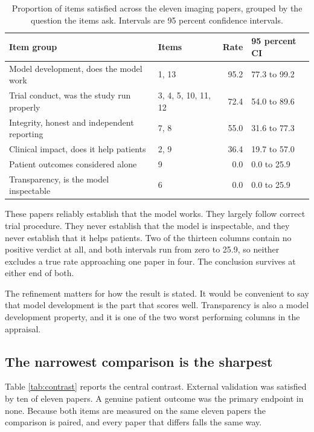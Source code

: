 \documentclass{article}
\begin{document}
\begin{table}[t]
  \caption{Proportion of items satisfied across the eleven imaging papers, grouped by the question
  the items ask. Intervals are 95 percent confidence intervals.}
  \label{tab:groups}
  \centering
  \begin{tabular}{llrl}
    \toprule
    Item group & Items & Rate & 95 percent CI \\
    \midrule
    Model development, does the model work      & 1, 13             & 95.2 & 77.3 to 99.2 \\
    Trial conduct, was the study run properly   & 3, 4, 5, 10, 11, 12 & 72.4 & 54.0 to 89.6 \\
    Integrity, honest and independent reporting & 7, 8              & 55.0 & 31.6 to 77.3 \\
    Clinical impact, does it help patients      & 2, 9              & 36.4 & 19.7 to 57.0 \\
    \midrule
    Patient outcomes considered alone           & 9                 & 0.0  & 0.0 to 25.9 \\
    Transparency, is the model inspectable      & 6                 & 0.0  & 0.0 to 25.9 \\
    \bottomrule
  \end{tabular}
\end{table}

These papers reliably establish that the model works. They largely follow correct trial procedure.
They never establish that the model is inspectable, and they never establish that it helps
patients. Two of the thirteen columns contain no positive verdict at all, and both intervals run
from zero to 25.9, so neither excludes a true rate approaching one paper in four. The conclusion
survives at either end of both.

The refinement matters for how the result is stated. It would be convenient to say that model
development is the part that scores well. Transparency is also a model development property, and it
is one of the two worst performing columns in the appraisal.

\subsection{The narrowest comparison is the sharpest}

Table \ref{tab:contrast} reports the central contrast. External validation was satisfied by ten of
eleven papers. A genuine patient outcome was the primary endpoint in none. Because both items are
measured on the same eleven papers the comparison is paired, and every paper that differs falls the
same way.
\end{document}
